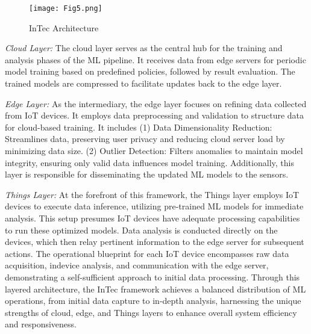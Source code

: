 \documentclass[11pt]{article}
\begin{document}
	\begin{figure}[h]
		\centering
		\texttt{[image: Fig5.png]}
		\caption{ InTec Architecture}
	\end{figure}
	
	\textit{Cloud Layer:} The cloud layer serves as the central hub for the training and analysis phases of the ML pipeline. It receives data from edge servers for periodic model training based on predefined policies, followed by result evaluation. The trained models are compressed to facilitate updates back to the edge layer.
	
	\textit{Edge Layer:} As the intermediary, the edge layer focuses on refining data collected
	from IoT devices. It employs data preprocessing and validation to structure data for
	cloud-based training. It includes (1) Data Dimensionality Reduction: Streamlines
	data, preserving user privacy and reducing cloud server load by minimizing data
	size. (2) Outlier Detection: Filters anomalies to maintain model integrity, ensuring
	only valid data influences model training. Additionally, this layer is responsible for
	disseminating the updated ML models to the sensors. 
	
	\textit{Things Layer: }	At the forefront of this framework, the Things layer employs IoT
	devices to execute data inference, utilizing pre-trained ML models for immediate
	analysis. This setup presumes IoT devices have adequate processing capabilities
	to run these optimized models. Data analysis is conducted directly on the devices,
	which then relay pertinent information to the edge server for subsequent actions.
	The operational blueprint for each IoT device encompasses raw data acquisition, indevice analysis, and communication with the edge server, demonstrating a self-sufficient approach to initial data processing. Through this layered architecture, the InTec
	framework achieves a balanced distribution of ML operations, from initial data capture to in-depth analysis, harnessing the unique strengths of cloud, edge, and Things layers to enhance overall system efficiency and responsiveness.
	
\end{document}
